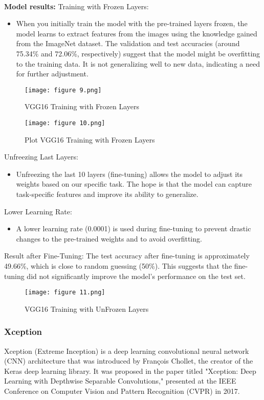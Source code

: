 \documentclass{article}
\begin{document}
\paragraph{}
\textbf{	Model results:}
Training with Frozen Layers:
\begin{itemize}
    \item When you initially train the model with the pre-trained layers frozen, the model learns to extract features from the images using the knowledge gained from the ImageNet dataset. The validation and test accuracies (around 75.34\% and 72.06\%, respectively) suggest that the model might be overfitting to the training data. It is not generalizing well to new data, indicating a need for further adjustment.
\end{itemize}
\begin{figure}[h]
    \centering
    \texttt{[image: figure 9.png]}
    \caption{VGG16 Training with Frozen Layers}
    \label{fig:enter-label}
\end{figure}
\begin{figure}[h]
    \centering
    \texttt{[image: figure 10.png]}
    \caption{Plot VGG16 Training with Frozen Layers}
    \label{fig:enter-label}
\end{figure}
Unfreezing Last Layers:
\begin{itemize}
    \item Unfreezing the last 10 layers (fine-tuning) allows the model to adjust its weights based on our specific task. The hope is that the model can capture task-specific features and improve its ability to generalize.
\end{itemize}
Lower Learning Rate:
\begin{itemize}
    \item A lower learning rate (0.0001) is used during fine-tuning to prevent drastic changes to the pre-trained weights and to avoid overfitting.
\end{itemize}
Result after Fine-Tuning: The test accuracy after fine-tuning is approximately 49.66\%, which is close to random guessing (50\%). This suggests that the fine-tuning did not significantly improve the model's performance on the test set.
\begin{figure}[h]
    \centering
    \texttt{[image: figure 11.png]}
    \caption{VGG16 Training with UnFrozen Layers}
    \label{fig:enter-label}
\end{figure}


\subsubsection{Xception}
Xception (Extreme Inception) is a deep learning convolutional neural network (CNN) architecture that was introduced by François Chollet, the creator of the Keras deep learning library. It was proposed in the paper titled "Xception: Deep Learning with Depthwise Separable Convolutions," presented at the IEEE Conference on Computer Vision and Pattern Recognition (CVPR) in 2017.
\end{document}
